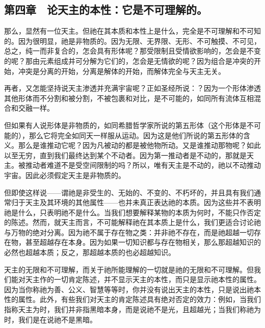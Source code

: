
\subsection{第四章　论天主的本性：它是不可理解的。}

那么，显然有一位天主。但祂在其本质和本性上是什么，完全是不可理解和不可知的。因为很明显，祂是非物质的。因为无限、无界限、无形、不可触摸、不可见，总之，纯一而非复合的，怎会具有形体呢？那受限制且受情欲影响的，怎会是不变的呢？那由元素组成并可分解为它们的，怎会是无情欲的呢？因为组合是冲突的开始，冲突是分离的开始，分离是解体的开始，而解体完全与天主无关。\par

再者，又怎能坚持说天主渗透并充满宇宙呢？正如圣经所说：？因为一个形体渗透其他形体而不分割和被分割，不被包裹和对比，是不可能的，如同所有流体互相混合和交融一样。\par

但如果有人说形体是非物质的，如同希腊哲学家所说的第五形体（这个形体是不可能的），那么它将完全如同天一样服从运动。因为这是他们所说的第五形体的含义。那么是谁推动它呢？因为凡被动的都是被他物所动。又是谁推动那物呢？如此以至无穷，直到我们最终达到某个不动者。因为第一推动者是不动的，那就是天主。被推动者难道不是受空间限制的吗？所以，唯有天主是不动的，祂以不动推动宇宙。因此必须假定天主是非物质的。\par

但即使这样说——谓祂是非受生的、无始的、不变的、不朽坏的，并且具有我们通常归于天主及其环境的其他属性——也并未真正表达祂的本质。因为这些并不表明祂是什么，只表明祂不是什么。当我们想要解释某物的本质为何时，不能只作否定的陈述。然而，就天主而言，不可能解释祂在其本质上是什么，我们更适合讨论祂与万物的绝对分离。因为祂不属于存在物之类：并非祂不存在，而是祂超越一切存在物，甚至超越存在本身。因为如果一切知识都与存在物相关，那么那超越知识的必然也超越本质；反之，那超越本质的也必超越知识。\par

天主的无限和不可理解，而关于祂所能理解的一切就是祂的无限和不可理解。但我们能对天主作的一切肯定陈述，并不显示天主的本性，而只是显示祂本性的属性。因为当你称祂为善、公义、智慧等等时，你并没有说出天主的本性，只是说出祂本性的属性。此外，有些我们对天主的肯定陈述具有绝对否定的效力：例如，当我们指称天主为时，我们并非指黑暗本身，而是说祂不是光，且超越光；当我们称祂为时，我们是在说祂不是黑暗。\par

